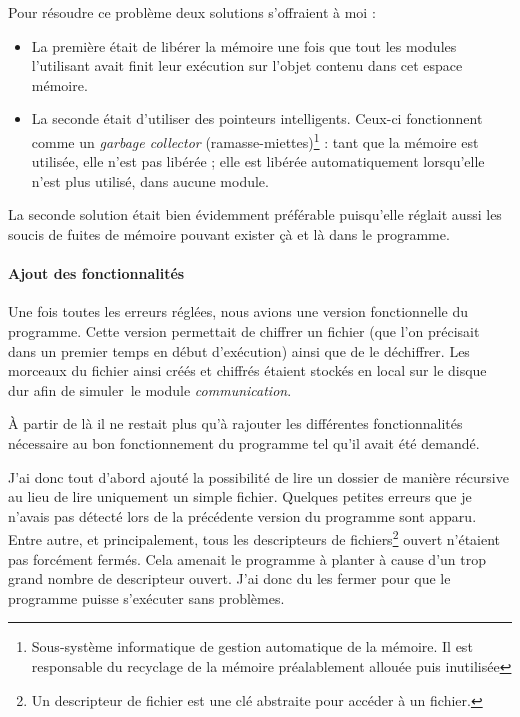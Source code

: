 \documentclass[a4paper,10pt, twoside]{report}
\begin{document}
\begin{spacing}{1.2}
Pour r\'esoudre ce probl\`eme deux solutions s'offraient \`a moi :
\begin{itemize}
 \item La premi\`ere \'etait de lib\'erer la m\'emoire une fois que tout les
 modules l'utilisant avait finit leur ex\'ecution sur l'objet contenu dans cet
 espace m\'emoire.
 \item La seconde \'etait d'utiliser des pointeurs intelligents. Ceux-ci
 fonctionnent comme un \textit{garbage collector} (ramasse-miettes)\footnote{
 Sous-syst\`eme informatique de gestion automatique de la m\'emoire. Il est
 responsable du recyclage de la m\'emoire pr\'ealablement allou\'ee puis
 inutilis\'ee} : tant que la m\'emoire est utilis\'ee, elle n'est pas
 lib\'er\'ee ; elle est lib\'er\'ee automatiquement lorsqu'elle n'est plus
 utilis\'e, dans aucune module.
\end{itemize}

La seconde solution \'etait bien \'evidemment pr\'ef\'erable puisqu'elle
r\'eglait aussi les soucis de fuites de m\'emoire pouvant exister \c{c}\`a et
l\`a dans le programme.

\paragraph{Ajout des fonctionnalit\'es}
Une fois toutes les erreurs r\'egl\'ees, nous avions une version fonctionnelle
du programme. Cette version permettait de chiffrer un fichier (que l'on
pr\'ecisait dans un premier temps en d\'ebut d'ex\'ecution) ainsi que de le
d\'echiffrer. Les morceaux du fichier ainsi cr\'e\'es et chiffr\'es \'etaient
stock\'es en local sur le disque dur afin de \flqq simuler\frqq~le module
\textit{communication}.

\`A partir de l\`a il ne restait plus qu'\`a rajouter les diff\'erentes
fonctionnalit\'es n\'ecessaire au bon fonctionnement du programme tel qu'il
avait \'et\'e demand\'e.

J'ai donc tout d'abord ajout\'e la possibilit\'e de lire un dossier de
mani\`ere r\'ecursive au lieu de lire uniquement un simple fichier. Quelques
petites erreurs que je n'avais pas d\'etect\'e lors de la pr\'ec\'edente
version du programme sont apparu. Entre autre, et principalement, tous les
descripteurs de fichiers\footnote{Un descripteur de fichier est une cl\'e
abstraite pour acc\'eder \`a un fichier.} ouvert n'\'etaient pas forc\'ement
ferm\'es. Cela amenait le programme \`a planter \`a cause d'un trop grand
nombre de descripteur ouvert. J'ai donc du les fermer pour que le programme
puisse s'ex\'ecuter sans probl\`emes.


\end{spacing}
\end{document}

